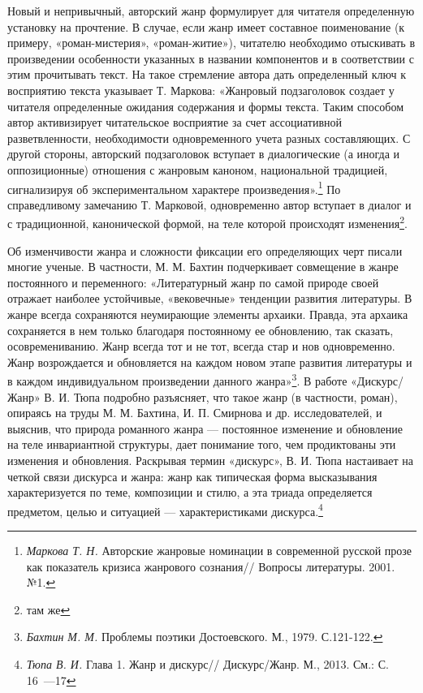\documentclass{kursa4}
\begin{document}
    Новый и непривычный, авторский жанр формулирует для читателя определенную установку на прочтение. В случае, если жанр имеет составное поименование (к примеру, «роман-мистерия», «роман-житие»), читателю необходимо отыскивать в произведении особенности указанных в названии компонентов и в соответствии с этим прочитывать текст. На такое стремление автора дать определенный ключ к восприятию текста указывает Т. Маркова:\newline
    «Жанровый подзаголовок создает у читателя определенные ожидания содержания и формы текста. Таким способом автор активизирует читательское восприятие за счет ассоциативной разветвленности, необходимости одновременного учета разных составляющих. С другой стороны, авторский подзаголовок вступает в диалогические (а иногда и оппозиционные) отношения с жанровым каноном, национальной традицией, сигнализируя об экспериментальном характере произведения».\footnote{{ }\textit{Маркова Т. Н.} Авторские жанровые номинации в современной русской прозе как показатель кризиса жанрового сознания// Вопросы литературы. 2001. №1.} По справедливому замечанию Т. Марковой, одновременно автор вступает в диалог и с традиционной, канонической формой, на теле которой происходят изменения\footnote{там же}. 

    Об изменчивости жанра и сложности фиксации его определяющих черт писали многие ученые. В частности, М. М. Бахтин подчеркивает совмещение в жанре постоянного и переменного: «Литературный жанр по самой природе своей отражает наиболее устойчивые, «вековечные» тенденции развития литературы. В жанре всегда сохраняются неумирающие элементы архаики. Правда, эта архаика сохраняется в нем только благодаря постоянному ее обновлению, так сказать, осовремениванию. Жанр всегда тот и не тот, всегда стар и нов одновременно. Жанр возрождается и обновляется на каждом новом этапе развития литературы и в каждом индивидуальном произведении данного жанра»\footnote{\textit{Бахтин М. М.} Проблемы поэтики Достоевского. М., 1979. С.121-122.}.  
    В работе «Дискурс/Жанр» В. И. Тюпа подробно разъясняет, что такое жанр (в частности, роман), опираясь на труды М. М. Бахтина, И. П. Смирнова и др. исследователей, и выяснив, что природа романного жанра — постоянное изменение и обновление на теле инвариантной структуры, дает понимание того, чем продиктованы эти изменения и обновления. Раскрывая термин «дискурс», В. И. Тюпа настаивает на четкой связи дискурса и жанра: жанр как типическая форма высказывания характеризуется по теме, композиции и стилю, а эта триада определяется предметом, целью и ситуацией — характеристиками дискурса.\footnote{\textit{Тюпа В. И.} Глава 1. Жанр и дискурс// Дискурс/Жанр. М., 2013. См.: С. 16~---17} 
\end{document}
